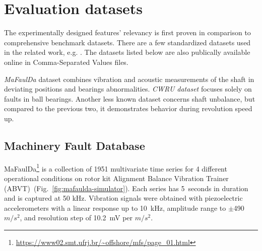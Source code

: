\section{Evaluation datasets} \label{section:evaluation-datasets}
The experimentally designed features' relevancy is first proven in comparison to comprehensive benchmark datasets. There are a few standardized datasets used in the related work, e.g. \cite{ribeiro_rotating_2017}. The datasets listed below are also publically available online in Comma-Separated Values files.

\emph{MaFaulDa} dataset combines vibration and acoustic measurements of the shaft in deviating positions and bearings abnormalities. \emph{CWRU dataset} focuses solely on faults in ball bearings. Another less known dataset concerns shaft unbalance, but compared to the previous two, it demonstrates behavior during revolution speed up.  

\subsection{Machinery Fault Database}
MaFaulDa\footnote{\url{https://www02.smt.ufrj.br/~offshore/mfs/page_01.html}} is a collection of 1951 multivariate time series for 4 different operational conditions on rotor kit Alignment Balance Vibration Trainer (ABVT)~(Fig.~\ref{fig:mafaulda-simulator}). Each series has 5~seconds in duration and is captured at 50 kHz. Vibration signals were obtained with piezoelectric accelerometers with a linear response up to 10~kHz, amplitude range to $\pm$490 $m/s^2$, and resolution step of 10.2~mV per $m/s^2$. 

